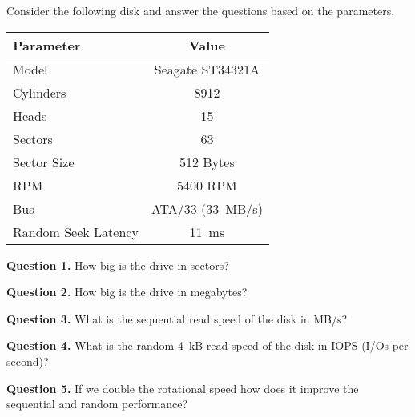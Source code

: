 \documentclass[letterpaper,twocolumn,10pt]{article}
\begin{document}
Consider the following disk and answer the questions based on the parameters.

\begin{table}[h!]
\centering
\begin{tabular}{l|c}
\toprule
{\bf Parameter} & {\bf Value} \\
\midrule
Model & Seagate ST34321A \\
Cylinders & 8912 \\
Heads & 15 \\
Sectors & 63 \\
Sector Size & 512 Bytes \\
RPM & 5400 RPM \\
Bus & ATA/33 (33~MB/s) \\
Random Seek Latency & 11~ms \\
\bottomrule
\end{tabular}
\end{table}

\noindent
\textbf{Question 1.} How big is the drive in sectors?

\vspace{12em}

\noindent
\textbf{Question 2.} How big is the drive in megabytes?

\vspace{12em}

\noindent
\textbf{Question 3.} What is the sequential read speed of the disk in MB/s?

\vspace{15em}

\break

\noindent
\textbf{Question 4.} What is the random 4~kB read speed of the disk in IOPS 
(I/Os per second)?

\vspace{24em}

\noindent
\textbf{Question 5.} If we double the rotational speed how does it improve the 
sequential and random performance?

\vspace{24em}
\end{document}
